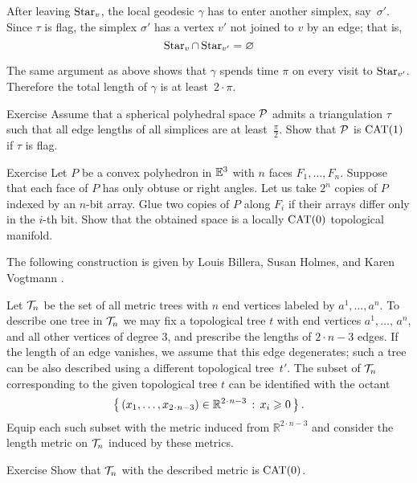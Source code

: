 After leaving $\mathop{\rm Star}\nolimits_v$,
the local geodesic $\gamma$ has to enter another simplex, 
say~$\sigma'$.
Since $\tau$ is flag, the simplex $\sigma'$
has a vertex $v'$ not joined to $v$ by an edge;
that is, 
\[\mathop{\rm Star}\nolimits_v\cap\mathop{\rm Star}\nolimits_{v'}=\varnothing\]

The same argument as above shows that $\gamma$ spends time $\pi$ on every visit to $\mathop{\rm Star}\nolimits_{v'}$.
Therefore the total length of $\gamma$ is at least~$2\cdot\pi$.
\qeds

\begin{thm}{Exercise}\label{ex:flag>=pi/2}
Assume that a spherical polyhedral space $\mathcal{P}$
admits a triangulation $\tau$ such that all edge lengths of all simplices are at least~$\tfrac\pi2$.
Show that $\mathcal{P}$ is $\mathrm{CAT}(1)$
if $\tau$ is flag.
\end{thm}

\begin{thm}{Exercise}\label{ex:polyhedron-glue}
Let $P$ be a convex polyhedron in $\mathbb{E}^3$ with $n$ faces $F_1,\dots, F_n$.
Suppose that each face of $P$ has only obtuse or right angles.
Let us take $2^n$ copies of $P$ indexed by an $n$-bit array.
Glue two copies of $P$ along $F_i$ if their arrays differ only in the $i$-th bit.
Show that the obtained space is a locally $\mathrm{CAT}(0)$ topological manifold.
\end{thm}

The following construction is given by
Louis Billera,
Susan Holmes,
and  Karen Vogtmann \cite{billera-holmes-vogtmann}.

Let $\mathcal{T}_n$ be the set of all metric trees with 
$n$ end vertices
labeled by $a^1,\dots,a^n$.
To describe one tree in $\mathcal{T}_n$ we may fix a topological tree $t$ with end vertices $a^1,\dots$, $a^n$,
and all other vertices of degree 3,  
and prescribe the lengths of $2\cdot n-3$ edges.
If the length of an edge vanishes, we assume that this edge degenerates;
such a tree can be also described using a different topological tree~$t'$.
The subset of $\mathcal{T}_n$ corresponding to the given topological tree $t$ can be identified with the octant
\[\set{(x_1,\dots,x_{2\cdot n-3})\in\mathbb{R}^{2\cdot n-3}}{x_i\ge 0}.\]
Equip each such subset with the metric induced from $\mathbb{R}^{2\cdot n-3}$ and consider the length metric on $\mathcal{T}_n$ induced by these metrics.

\begin{thm}{Exercise}\label{ex:tree}
Show that $\mathcal{T}_n$ with the described metric is $\mathrm{CAT}(0)$.
\end{thm}

